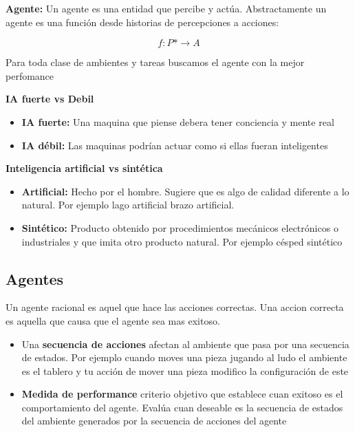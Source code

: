 \textbf{Agente: }Un agente es una entidad que percibe y actúa. Abstractamente un agente es una función desde historias de percepciones a acciones:

\begin{equation}
  f: P* \rightarrow A 
\end{equation}

Para toda clase de ambientes y tareas buscamos el agente con la mejor perfomance

\textbf{IA fuerte vs Debil }
\begin{itemize}
  \item \textbf{IA fuerte: }Una maquina que piense debera tener conciencia y mente real
  \item \textbf{IA débil: }Las maquinas podrían actuar como si ellas fueran inteligentes
\end{itemize}

\textbf{Inteligencia artificial vs sintética}
\begin{itemize}
  \item \textbf{Artificial: }Hecho por el hombre. Sugiere que es algo de calidad diferente a lo natural. Por ejemplo lago artificial brazo artificial.
  \item \textbf{Sintético: }Producto obtenido por procedimientos mecánicos electrónicos o industriales y que imita otro producto natural. Por ejemplo césped sintético  
\end{itemize}

\subsection{Agentes}
Un agente racional es aquel que hace las acciones correctas. Una accion correcta es aquella que causa que el agente sea mas exitoso.
\begin{itemize}
  \item Una \textbf{secuencia de acciones} afectan al ambiente que pasa por una secuencia de estados. Por ejemplo cuando moves una pieza jugando al ludo el ambiente es el tablero y tu acción de mover una pieza modifico la configuración de este
  \item \textbf{Medida de performance} criterio objetivo que establece cuan exitoso es el comportamiento del agente. Evalúa cuan deseable es la secuencia de estados del ambiente generados por la secuencia de acciones del agente
\end{itemize}

